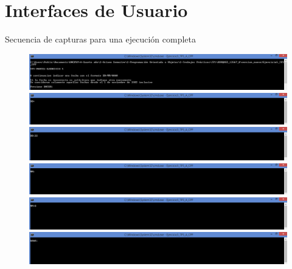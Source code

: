 \documentclass[a4paper,12pt]{article}
\begin{document}
\section{Interfaces de Usuario}
Secuencia de capturas para una ejecución completa
\begin{figure}[!ht]
    \centering
    \begin{adjustbox}{max width=\textwidth, center}
        \includegraphics{Captura_UI_1.PNG}
    \end{adjustbox}
    \centering
    \begin{adjustbox}{max width=\textwidth, center}
        \includegraphics{Captura_UI_2.PNG}
    \end{adjustbox}
    \centering
    \begin{adjustbox}{max width=\textwidth, center}
        \includegraphics{Captura_UI_3.PNG}
    \end{adjustbox}
    \centering
    \begin{adjustbox}{max width=\textwidth, center}
        \includegraphics{Captura_UI_4.PNG}
    \end{adjustbox}
    \begin{adjustbox}{max width=\textwidth, center}
        \includegraphics{Captura_UI_5.PNG}
    \end{adjustbox}
    \begin{adjustbox}{max width=\textwidth, center}
        \includegraphics{Captura_UI_6.PNG}

\end{adjustbox}
\end{figure}
\end{document}
